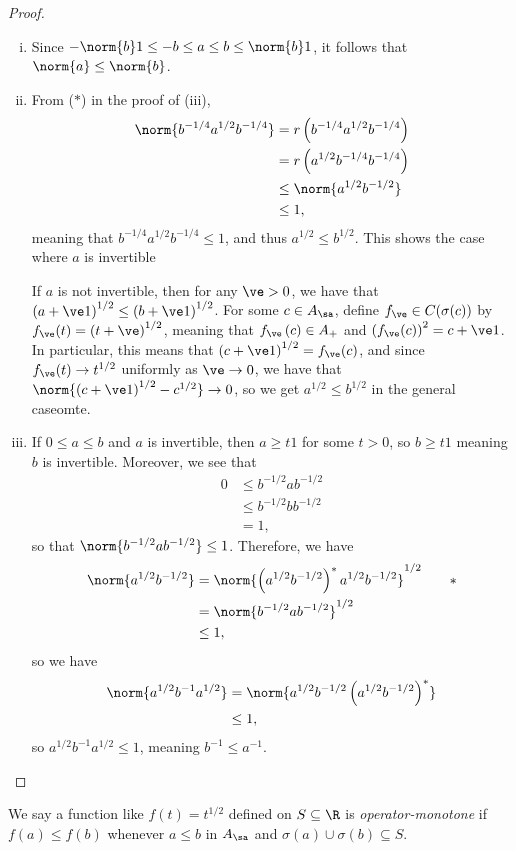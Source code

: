 \documentclass[10pt]{mypackage}
\begin{document}
\begin{proof}\hfill
  \begin{enumerate}[(i)]
    \item Since $-\norm{b}1 \leq -b \leq a \leq b \leq \norm{b}1$, it follows that $\norm{a}\leq \norm{b}$.
    \item From ($\ast$) in the proof of (iii),
      \begin{align*}
        \norm{b^{-1/4}a^{1/2}b^{-1/4}} &= r\left( b^{-1/4}a^{1/2}b^{-1/4} \right)\\
                                       &= r\left( a^{1/2}b^{-1/4}b^{-1/4} \right)\\
                                       &\leq \norm{a^{1/2}b^{-1/2}}\\
                                       &\leq 1,
      \end{align*}
      meaning that $b^{-1/4}a^{1/2}b^{-1/4}\leq 1$, and thus $a^{1/2}\leq b^{1/2}$. This shows the case where $a$ is invertible

      If $a$ is not invertible, then for any $\ve > 0$, we have that $\left( a + \ve 1 \right)^{1/2}\leq \left( b + \ve 1 \right)^{1/2}$. For some $c\in A_{\sa}$, define $f_{\ve}\in C(\sigma(c))$ by $f_{\ve}(t) = \left( t + \ve \right)^{1/2}$, meaning that $f_{\ve}\left( c \right)\in A_{+}$ and $\left( f_{\ve}(c) \right)^2 = c + \ve 1$. In particular, this means that $\left( c + \ve 1 \right)^{1/2} = f_{\ve}(c)$, and since $f_{\ve}(t)\rightarrow t^{1/2}$ uniformly as $\ve \rightarrow 0$, we have that $\norm{\left( c + \ve1 \right)^{1/2} - c^{1/2}}\rightarrow 0$, so we get $a^{1/2}\leq b^{1/2}$ in the general caseomte.
    \item If $0\leq a \leq b$ and $a$ is invertible, then $a\geq t1$ for some $t > 0$, so $b \geq t1$ meaning $b$ is invertible. Moreover, we see that
      \begin{align*}
        0 &\leq b^{-1/2}ab^{-1/2}\\
          &\leq b^{-1/2}bb^{-1/2}\\
          &= 1,
      \end{align*}
      so that $\norm{b^{-1/2}ab^{-1/2}} \leq 1$. Therefore, we have
      \begin{align*}
        \norm{a^{1/2}b^{-1/2}} &= \norm{\left( a^{1/2} b^{-1/2}\right)^{\ast}a^{1/2}b^{-1/2}}^{1/2}\tag*{$\ast$}\\
                               &= \norm{b^{-1/2}ab^{-1/2}}^{1/2}\\
                               &\leq 1,
      \end{align*}
      so we have
      \begin{align*}
        \norm{a^{1/2}b^{-1}a^{1/2}} &= \norm{a^{1/2}b^{-1/2}\left( a^{1/2}b^{-1/2} \right)^{\ast}}\\
                                    &\leq 1,
      \end{align*}
      so $a^{1/2}b^{-1}a^{1/2}\leq 1$, meaning $b^{-1}\leq a^{-1}$.
  \end{enumerate}
\end{proof}
We say a function like $f(t) = t^{1/2}$ defined on $S\subseteq \R$ is \textit{operator-monotone} if $f(a)\leq f(b)$ whenever $a\leq b$ in $A_{\sa}$ and $\sigma(a)\cup \sigma(b)\subseteq S$.
\end{document}
